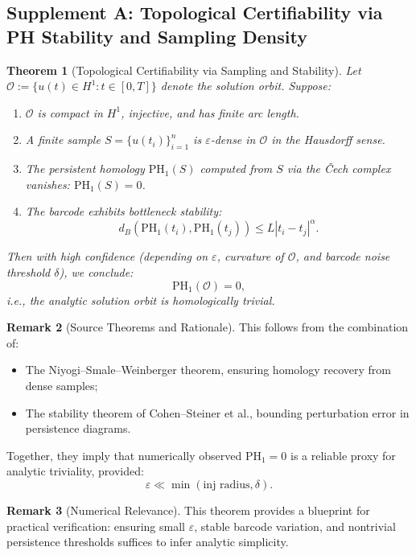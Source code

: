 \documentclass[11pt]{article}
\newtheorem{theorem}{Theorem}[section]
\theoremstyle{definition}
\newtheorem{remark}[theorem]{Remark}
\begin{document}
\subsection{Supplement A: Topological Certifiability via PH Stability and Sampling Density}

\begin{theorem}[Topological Certifiability via Sampling and Stability]
\label{thm:certifiability}
Let $\mathcal{O} := \{ u(t) \in H^1 : t \in [0,T] \}$ denote the solution orbit. Suppose:
\begin{enumerate}
    \item $\mathcal{O}$ is compact in $H^1$, injective, and has finite arc length.
    \item A finite sample $S = \{ u(t_i) \}_{i=1}^n$ is $\varepsilon$-dense in $\mathcal{O}$ in the Hausdorff sense.
    \item The persistent homology $\mathrm{PH}_1(S)$ computed from $S$ via the Čech complex vanishes: $\mathrm{PH}_1(S) = 0$.
    \item The barcode exhibits bottleneck stability:
    \[
    d_B(\mathrm{PH}_1(t_i), \mathrm{PH}_1(t_j)) \leq L|t_i - t_j|^\alpha.
    \]
\end{enumerate}
Then with high confidence (depending on $\varepsilon$, curvature of $\mathcal{O}$, and barcode noise threshold $\delta$), we conclude:
\[
\mathrm{PH}_1(\mathcal{O}) = 0,
\]
i.e., the analytic solution orbit is homologically trivial.
\end{theorem}

\begin{remark}[Source Theorems and Rationale]
This follows from the combination of:
\begin{itemize}
    \item The Niyogi–Smale–Weinberger theorem, ensuring homology recovery from dense samples;
    \item The stability theorem of Cohen–Steiner et al., bounding perturbation error in persistence diagrams.
\end{itemize}
Together, they imply that numerically observed $\mathrm{PH}_1 = 0$ is a reliable proxy for analytic triviality, provided:
\[
\varepsilon \ll \min(\text{inj radius}, \delta).
\]
\end{remark}

\begin{remark}[Numerical Relevance]
This theorem provides a blueprint for practical verification: ensuring small $\varepsilon$, stable barcode variation, and nontrivial persistence thresholds suffices to infer analytic simplicity.
\end{remark}
\end{document}
